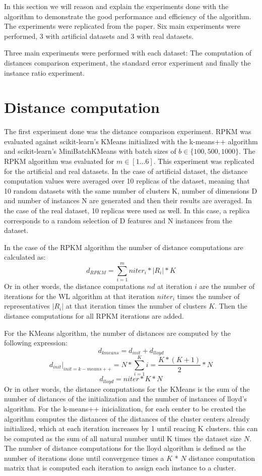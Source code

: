 In this section we will reason and explain the experiments done with the algorithm to demonstrate the good performance and efficiency of the algorithm. The experiments were replicated from the paper. Six main experiments were performed, 3 with artificial datasets and 3 with real datasets.


Three main experiments were performed with each dataset: The computation of distances comparison experiment, the standard error experiment and finally the instance ratio experiment.

\section{Distance computation}

The first experiment done was the distance comparison experiment. RPKM was evaluated against scikit-learn's KMeans initialized with the k-means++ algorithm and scikit-learn's MiniBatchKMeans with batch sizes of $b \in \{100, 500, 1000\}$. The RPKM algorithm was evaluated for $m \in [1\dots6]$. This experiment was replicated for the artificial and real datasets. In the case of artificial dataset, the distance computation values were averaged over 10 replicas of the dataset, meaning that 10 random datasets with the same number of clusters K, number of dimensions D and number of instances N are generated and then their results are averaged. In the case of the real dataset, 10 replicas were used as well. In this case, a replica corresponds to a random selection of D features and N instances from the dataset.

In the case of the RPKM algorithm the number of distance computations are calculated as:
$$d_{RPKM} = \sum_{i=1}^m niter_i * |R_i| *K$$
Or in other words, the distance computations $nd$ at iteration $i$ are the number of iterations for the WL algorithm at that iteration $niter_i$ times the number of representatives $|R_i|$ at that iteration times the number of clusters $K$. Then the distance computations for all RPKM iterations are added.

For the KMeans algorithm, the number of distances are computed by the following expression:
$$d_{kmeans} = d_{init} + d_{lloyd}$$
$$d_{init} \bigg\rvert_{init=k-means++} = N * \sum_{i=1}^K i = \frac{K*(K+1)}{2} * N$$
$$d_{lloyd} = niter * K * N$$
Or in other words, the distance computations for the KMeans is the sum of the number of distances of the initialization and the number of instances of lloyd's algorithm. For the k-means++ inicialization, for each center to be created the algorithm computes the distances of the distances of the cluster centers already initialized, which at each iteration increases by 1 until reacing K clusters. this can be computed as the sum of all natural number until K times the dataset size $N$. The number of distance computations for the lloyd algorithm is defined as the number of iterations done until convergence times a $K$ * $N$ distance computation matrix that is computed each iteration to assign each instance to a cluster.

